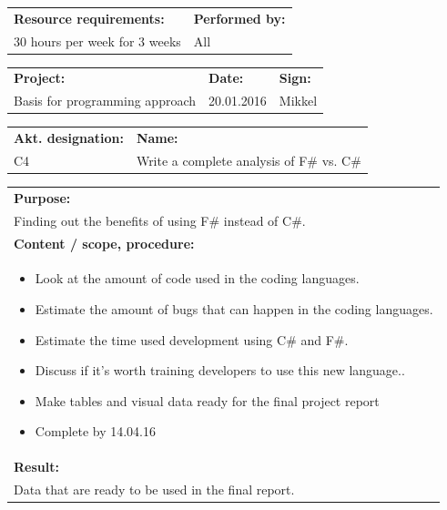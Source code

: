 \documentclass[12pt, a4paper]{article}
\begin{document}
\begin{tabularx}{\textwidth}{|X|p{30mm}|}
	\textbf{Resource requirements:}&\textbf{Performed by:}\\
	30 hours per week for 3 weeks&All\\
	\hline
\end{tabularx}

\newpage

\begin{tabularx}{\textwidth}{|X|p{32mm}|p{20mm}|}
	\hline
	\textbf{Project:}&\textbf{Date:}&\textbf{Sign:}\\
	Basis for programming approach&20.01.2016&Mikkel\\
	\hline
\end{tabularx}

\begin{tabularx}{\textwidth}{|p{40mm}|X|}
	\textbf{Akt. designation:}&\textbf{Name:}\\
	C4&Write a complete analysis of F\# vs. C\#  \\
	\hline
\end{tabularx}

\begin{tabularx}{\textwidth}{|X|}
	\textbf{Purpose:}\\
	Finding out the benefits of using F\# instead of C\#.\\
	\hline
	\textbf{Content / scope, procedure:}\\
	\begin{itemize}
		\item Look at the amount of code used in the coding languages.
		\item Estimate the amount of bugs that can happen in the coding languages.
		\item Estimate the time used development using C\# and F\#.
		\item Discuss if it’s worth training developers to use this new language..
		\item Make tables and visual data ready for the final project report
		\item Complete by 14.04.16
	\end{itemize}\\
 	\hline
	\textbf{Result:}\\
	Data that are ready to be used in the final report. \\
	\hline
\end{tabularx}
\end{document}
